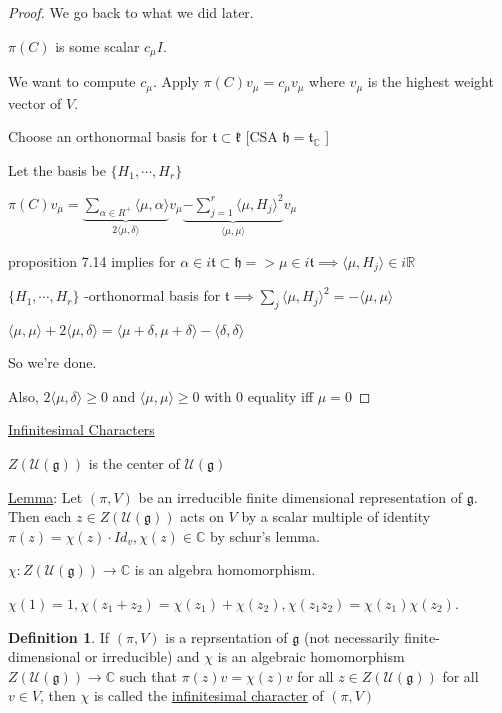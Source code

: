 \documentclass{article}
\theoremstyle{definition}
\newtheorem{definition}{Definition}
\begin{document}
\begin{proof}
    We go back to what we did later.

    \(\pi(C)\) is some scalar \(c_\mu I\).

    We want to compute \(c_\mu\). Apply \(\pi(C)v_\mu = c_\mu v_\mu\) where \(v_\mu\) is the highest weight vector of \(V\).

    Choose an orthonormal basis for \(\mathfrak{t} \subset \mathfrak{k}\) [CSA \(\mathfrak{h} = \mathfrak{t}_\mathbb{C}\) ]
    
    Let the basis be \(\{ H_1,\cdots, H_r \}\) 

    \(\pi(C)v_\mu = \underbrace{\sum_{\alpha \in R^+} \langle \mu , \alpha \rangle}_{2\langle \mu , \delta \rangle } v_\mu \underbrace{-\sum_{j=1} ^r \langle \mu , H_j \rangle ^2}_{\langle \mu , \mu \rangle } v_\mu  \) 

    proposition 7.14 implies for \(\alpha \in i \mathfrak{t} \subset \mathfrak{h} =>\mu \in i \mathfrak{t} \implies \langle \mu , H_j \rangle \in i \mathbb{R}  \) 

    \(\{ H_1,\cdots, H_r \}\) -orthonormal basis for \(\mathfrak{t} \implies \sum_{j} \langle \mu , H_j \rangle ^2 = - \langle \mu , \mu \rangle  \) 
    
    \(\langle \mu , \mu \rangle + 2 \langle \mu , \delta \rangle = \langle \mu  + \delta , \mu + \delta \rangle - \langle \delta , \delta  \rangle  \) 

    So we're done.

    Also, \(2 \langle \mu , \delta \rangle \geq 0 \) and \(\langle \mu , \mu \rangle \geq 0 \) with \(0\) equality iff \(\mu =0\)

\end{proof}

\underline{Infinitesimal Characters}

\(Z(\mathcal{U} (\mathfrak{g}))\) is the center of \(\mathcal{U}(\mathfrak{g})\)  

\underline{Lemma}: Let \((\pi , V)\) be an irreducible finite dimensional representation of \(\mathfrak{g}\). Then each \(z\in Z(\mathcal{U}(\mathfrak{g}))\) acts on \(V\) by a scalar multiple of identity \(\pi(z)=\chi(z)\cdot Id_v, \chi(z)\in \mathbb{C}\) by schur's lemma.

\(\chi : Z(\mathcal{U}(\mathfrak{g}))\to\mathbb{C}\) is an algebra homomorphism.

\(\chi(1)=1, \chi(z_1 + z_2)=\chi(z_1)+\chi(z_2), \chi(z_1 z_2)=\chi(z_1)\chi(z_2)\).

\begin{definition}
    If \((\pi,V)\) is a reprsentation of \(\mathfrak{g}\) (not necessarily finite-dimensional or irreducible) and \(\chi\) is an algebraic homomorphism \(Z(\mathcal{U}(\mathfrak{g}))\to \mathbb{C}\) such that \(\pi(z)v=\chi(z)v\) for all \(z\in Z(\mathcal{U}(\mathfrak{g}))\) for all \(v\in V\), then \(\chi\) is called the \underline{infinitesimal character} of \((\pi , V )\)        
\end{definition}
\end{document}
